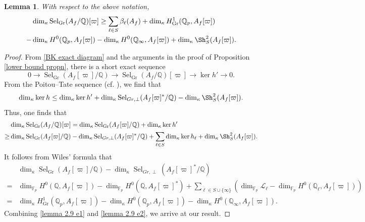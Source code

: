 \documentclass[table]{amsart}
\newtheorem{lemma}[theorem]{Lemma}
\newcommand{\Q}{\mathbb{Q}}
\newcommand{\op}[1]{\operatorname{#1}}
\numberwithin{equation}{section}
\begin{document}
\begin{lemma}
    With respect to the above notation, 
    \[\begin{split}&\dim_{\kappa}\operatorname{Sel}_{\operatorname{Gr}}(A_f/\mathbb{Q})[\varpi]\geq \sum_{\ell\in S} \beta_\ell(A_f)
    + \dim_{\kappa} H^1_{\op{Gr}}(\Q_p, A_f[\varpi]) \\ -&\dim_{\kappa} H^0(\Q_p, A_f[\varpi])- \dim_{\kappa} H^0(\Q_\infty,  A_f[\varpi])+\dim_{\kappa} \Sh_S^2(A_f[\varpi]).\end{split}\]
\end{lemma}
\begin{proof}
    From \eqref{BK exact diagram} and the arguments in the proof of Proposition \ref{lower bound propn}, there is a short exact sequence
    \[
0 \longrightarrow \operatorname{Sel}_{\operatorname{Gr}}(A_f[\varpi]/\mathbb{Q}) \longrightarrow \operatorname{Sel}_{\operatorname{Gr}}(A_f/\mathbb{Q})[\varpi] \longrightarrow  \ker h'\rightarrow 0.
\]
From the Poitou--Tate sequence (cf. \cite[p.~555, line 7]{tayloricosahedral}), we find that 
\[\dim_{\kappa} \op{ker} h\leq \dim_{\kappa} \op{ker} h'+ \dim_{\kappa} \op{Sel}_{Gr, \perp} (A_f[\varpi]^*/\Q)-\dim_{\kappa} \Sh_S^2(A_f[\varpi]).\]
Thus, one finds that 
\begin{equation}\label{lemma 2.9 e1}
\begin{split}& \dim_{\kappa}\operatorname{Sel}_{\operatorname{Gr}}(A_f/\mathbb{Q})[\varpi]=  \dim_{\kappa}\operatorname{Sel}_{\operatorname{Gr}}(A_f[\varpi]/\mathbb{Q})+\dim_{\kappa}\ker h'\\
\geq &  \dim_{\kappa}\operatorname{Sel}_{\operatorname{Gr}}(A_f[\varpi]/\mathbb{Q})-\dim_{\kappa} \op{Sel}_{Gr, \perp} (A_f[\varpi]^*/\Q)+\sum_{\ell\in S} \dim_{\kappa} \op{ker}h_\ell+\dim_{\kappa} \Sh_S^2(A_f[\varpi]).
\end{split}\end{equation}
It follows from Wiles' formula \cite[Theorem 8.7.9]{NSW} that 
\begin{equation}\label{lemma 2.9 e2}\begin{split} &\dim_{\kappa}\operatorname{Sel}_{\operatorname{Gr}}(A_f[\varpi]/\mathbb{Q})-\dim_{\kappa} \op{Sel}_{Gr, \perp} (A_f[\varpi]^*/\Q)\\ 
=& \dim_{\mathbb{F}_p} H^0(\mathbb{Q}, A_f[\varpi]) - \dim_{\mathbb{F}_p} H^0(\mathbb{Q}, A_f[\varpi]^*) + \sum_{\ell \in S\cup \{\infty\}} \left( \dim_{\mathbb{F}_p} \mathcal{L}_\ell - \dim_{\mathbb{F}_p} H^0(\mathbb{Q}_\ell, A_f[\varpi]) \right)\\
= & \dim_{\kappa} H^1_{\op{Gr}}(\Q_p, A_f[\varpi])-\dim_{\kappa} H^0(\Q_p, A_f[\varpi])- \dim_{\kappa} H^0(\Q_\infty,  A_f[\varpi]).
\end{split}\end{equation}
Combining \eqref{lemma 2.9 e1} and \eqref{lemma 2.9 e2}, we arrive at our result.
\end{proof}
\end{document}
